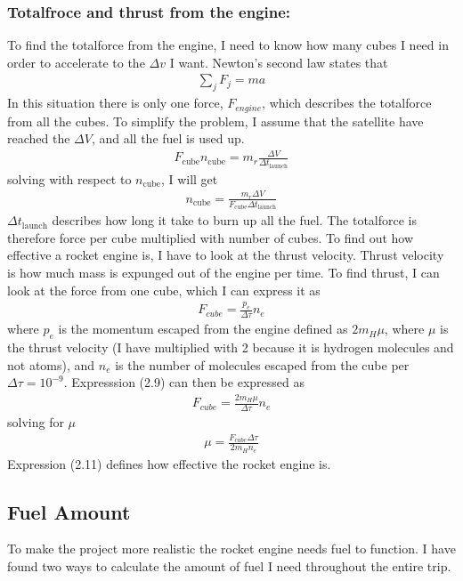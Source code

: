 \documentclass[a4paper,11pt,english]{report}
\begin{document}
\subsubsection{Totalfroce and thrust from the engine:} To find the totalforce from the
engine, I need to know how many cubes I need in order to accelerate to the
\(\Delta v\) I want. Newton's second law states that
\begin{align}
  \sum_{j}F_{j} = ma
\end{align}
In this situation there is only one force, \(F_{engine}\), which describes the
totalforce from all the cubes. To simplify the problem, I assume that the
satellite have
reached the \(\Delta V\), and all the fuel is used up. 
\begin{align}
  F_{\mathrm{cube}}n_{\mathrm{cube}} = m_{r}\frac{\Delta V}{\Delta t_{\mathrm{launch}}}
\end{align}
solving with respect to \(n_{\mathrm{cube}}\), I will get
\begin{align}
  n_{\mathrm{cube}} = \frac{m_{r}\Delta V}{F_{\mathrm{cube}}\Delta t_{\mathrm{launch}}}
\end{align}
\(\Delta t_{\mathrm{launch}}\) describes how long it take to burn up all the
fuel. The totalforce is therefore force per cube multiplied with number of
cubes. To find out how effective a rocket engine is, I have to look at the
thrust velocity. Thrust velocity is how much mass is expunged out of the engine per time. To find
thrust, I can look at the force from one cube, which I can express it as
\begin{align}
  F_{cube} = \frac{p_{e}}{\Delta \tau}n_{e}
\end{align}
where \(p_{e}\) is the momentum escaped from the engine defined as
\(2m_{H}\mu\), where \(\mu\) is the thrust velocity (I have multiplied with 2 because it
is hydrogen molecules and not atoms), and \(n_{e}\) is the number of molecules
escaped from the cube per \(\Delta \tau = 10^{-9}\). Expresssion (2.9) can then be expressed
as
\begin{align}
  F_{cube} = \frac{2m_{H}\mu}{\Delta \tau}n_{e}
\end{align}
solving for \(\mu\)
\begin{align}
  \mu = \frac{F_{cube}\Delta \tau}{2 m_{H}n_{e}}
\end{align}
Expression (2.11) defines how effective the rocket engine is.
\newpage
\subsection{Fuel Amount}
To make the project more realistic the rocket engine needs fuel to function. I have
found two ways to calculate the amount of fuel I need throughout the entire trip.
\end{document}
